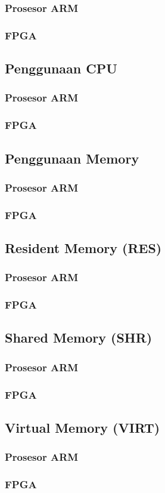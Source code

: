\subsubsection{Prosesor ARM}
\subsubsection{FPGA}

\subsection{Penggunaan CPU}
\blindtext
\subsubsection{Prosesor ARM}
\subsubsection{FPGA}

\subsection{Penggunaan Memory}
\blindtext
\subsubsection{Prosesor ARM}
\subsubsection{FPGA}

\subsection{Resident Memory (RES)}
\blindtext
\subsubsection{Prosesor ARM}
\subsubsection{FPGA}

\subsection{Shared Memory (SHR)}
\blindtext
\subsubsection{Prosesor ARM}
\subsubsection{FPGA}

\subsection{Virtual Memory (VIRT)}
\blindtext
\subsubsection{Prosesor ARM}
\subsubsection{FPGA}